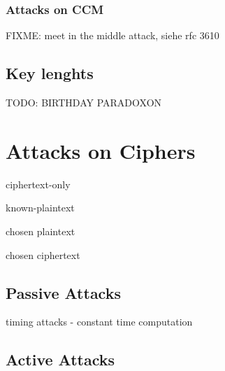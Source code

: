 \subsubsection{Attacks on CCM}

FIXME: meet in the middle attack, siehe rfc 3610

\subsection{Key lenghts}

\cite{Lenstra04keylength}

TODO: BIRTHDAY PARADOXON

\section{Attacks on Ciphers}

ciphertext-only

known-plaintext

chosen plaintext

chosen ciphertext

\subsection{Passive Attacks}

timing attacks - constant time computation

\subsection{Active Attacks}

% 
% 
